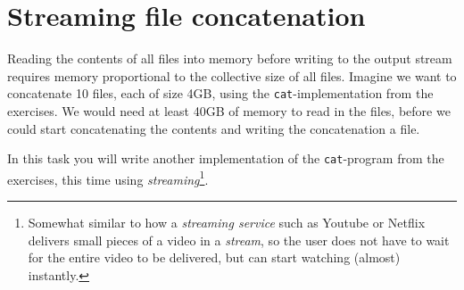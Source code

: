 \section*{Streaming file concatenation}
Reading the contents of all files into memory before writing to the output stream requires memory proportional to the collective size of all files. Imagine we want to concatenate 10 files, each of size 4GB, using the \texttt{cat}-implementation from the exercises. We would need at least 40GB of memory to read in the files, before we could start concatenating the contents and writing the concatenation a file.

In this task you will write another implementation of the \texttt{cat}-program from the exercises, this time using \textit{streaming}\footnote{Somewhat similar to how a \textit{streaming service} such as Youtube or Netflix delivers small pieces of a video in a \textit{stream}, so the user does not have to wait for the entire video to be delivered, but can start watching (almost) instantly.}.